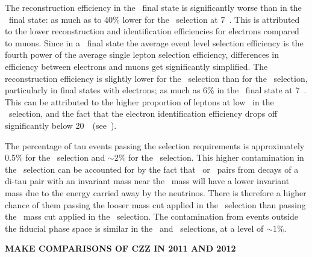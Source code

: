 The reconstruction efficiency in the \eeee\ final state is significantly worse
than in the \mmmm\ final state: as much as to 40\% lower for the \ZZs\ selection
at 7~\tev. This is attributed to the lower reconstruction and identification
efficiencies for electrons compared to muons. Since in a \fourlep\ final state
the average event level selection efficiency is the fourth power of the average
single lepton selection efficiency, differences in efficiency between electrons
and muons get significantly simplified. The reconstruction efficiency is 
slightly lower for the \ZZs\ selection than for the \ZZ\ selection, particularly
in final states with electrons; as much as
6\% in the \eeee\ final state at 7~\tev. This can be attributed to the higher
proportion of leptons at low \pt\ in the \ZZs\ selection, and the fact that the
electron identification efficiency drops off significantly below
20~\gev\ (see~).

The percentage of tau events passing the selection requirements is approximately
0.5\% for the \ZZ\ selection and $\sim2\%$ for the \ZZs\ selection. This higher
contamination in the \ZZs\ selection can be accounted for by the fact that
\dielectron\ or \dimuon\ pairs from decays of a di-tau pair with an invariant mass
near the \Z\ mass will have a lower invariant mass due to the energy carried
away by the neutrinos. There is therefore a higher chance of them passing the
looser mass cut applied in the \ZZs\ selection than passing the \sstooos\ mass
cut applied in the \ZZ\ selection. The contamination from events outside the
fiducial phase space is similar in the \ZZ\ and \ZZs\ selections, at a level of
$\sim1\%$.

{\bf MAKE COMPARISONS OF CZZ IN 2011 AND 2012}


